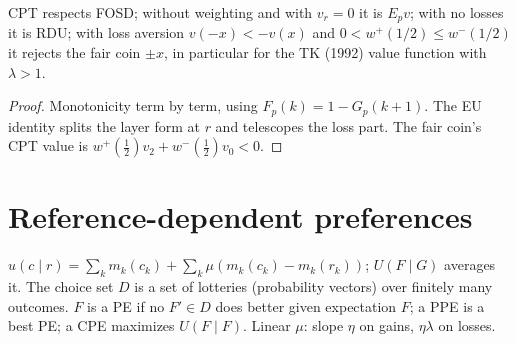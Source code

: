 \begin{theorem}[CPT]
\label{thm:beh-cpt}
\leanok
{}
CPT respects FOSD; without weighting and with $v_r=0$ it is $E_pv$; with no losses it is RDU; with loss aversion
$v(-x)<-v(x)$ and $0<w^+(1/2)\le w^-(1/2)$ it rejects the fair coin $\pm x$, in particular for the TK (1992)
value function with $\lambda>1$.
\end{theorem}
\begin{proof}
\leanok
Monotonicity term by term, using $F_p(k)=1-G_p(k+1)$. The EU identity splits the layer form at $r$ and
telescopes the loss part. The fair coin's CPT value is $w^+(\tfrac12)v_2+w^-(\tfrac12)v_0<0$.
\end{proof}

\section{Reference-dependent preferences}
\label{sec:beh-kr}

\begin{definition}
\label{def:beh-kr}
\leanok
$u(c\mid r)=\sum_k m_k(c_k)+\sum_k\mu(m_k(c_k)-m_k(r_k))$; $U(F\mid G)$ averages it. The choice set $D$ is a set of
lotteries (probability vectors) over finitely many outcomes. $F$ is a PE if no $F'\in D$ does
better given expectation $F$; a PPE is a best PE; a CPE maximizes $U(F\mid F)$. Linear $\mu$: slope $\eta$ on gains,
$\eta\lambda$ on losses.
\end{definition}

